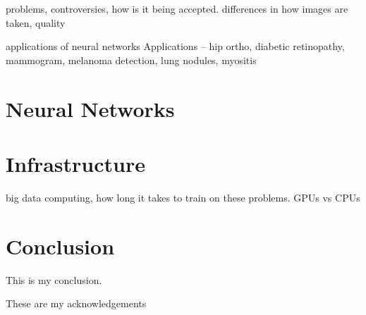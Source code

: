 \documentclass[sigconf]{acmart}
\begin{document}
problems, controversies, how is it being accepted. differences in how images are taken, quality

applications of neural networks Applications – hip ortho, diabetic retinopathy, mammogram, melanoma detection, lung nodules, myositis



\section{Neural Networks}

\section{Infrastructure}

big data computing, how long it takes to train on these problems. GPUs vs CPUs

\section{Conclusion}

 This is my conclusion.

 
\begin{acks}

 These are my acknowledgements

\end{acks}



 


\appendix
 


\end{document}
